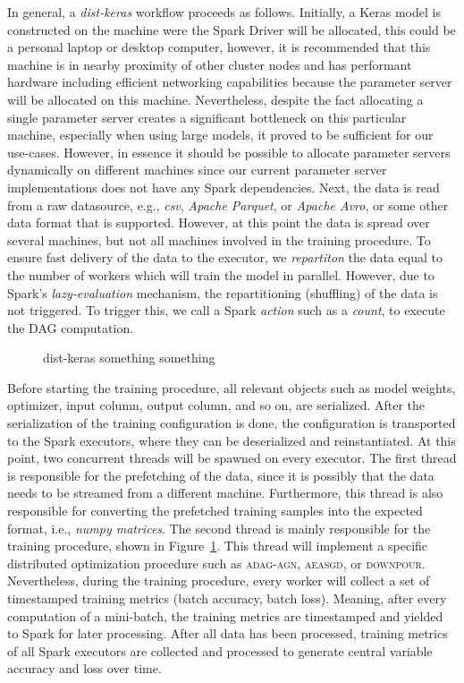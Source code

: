 In general, a \emph{dist-keras} workflow proceeds as follows. Initially, a Keras model is constructed on the machine were the Spark Driver will be allocated, this could be a personal laptop or desktop computer, however, it is recommended that this machine is in nearby proximity of other cluster nodes and has performant hardware including efficient networking capabilities because the parameter server will be allocated on this machine. Nevertheless, despite the fact allocating a single parameter server creates a significant bottleneck on this particular machine, especially when using large models, it proved to be sufficient for our use-cases. However, in essence it should be possible to allocate parameter servers dynamically on different machines since our current parameter server implementations does not have any Spark dependencies. Next, the data is read from a raw datasource, e.g., \emph{csv}, \emph{Apache Parquet}, or \emph{Apache Avro}, or some other data format that is supported. However, at this point the data is spread over several machines, but not all machines involved in the training procedure. To ensure fast delivery of the data to the executor, we \emph{repartiton} the data equal to the number of workers which will train the model in parallel. However, due to Spark's \emph{lazy-evaluation} mechanism, the repartitioning (shuffling) of the data is not triggered. To trigger this, we call a Spark \emph{action} such as a \emph{count}, to execute the DAG computation.

\begin{figure}[H]
  \centering
  \caption{dist-keras something something}
  \label{fig:dist_keras_architecture}
\end{figure}

Before starting the training procedure, all relevant objects such as model weights, optimizer, input column, output column, and so on, are serialized. After the serialization of the training configuration is done, the configuration is transported to the Spark executors, where they can be deserialized and reinstantiated. At this point, two concurrent threads will be spawned on every executor. The first thread is responsible for the prefetching of the data, since it is possibly that the data needs to be streamed from a different machine. Furthermore, this thread is also responsible for converting the prefetched training samples into the expected format, i.e., \emph{numpy matrices}. The second thread is mainly responsible for the training procedure, shown in Figure~\ref{fig:dist_keras_architecture}. This thread will implement a specific distributed optimization procedure such as \textsc{adag-agn}, \textsc{aeasgd}, or \textsc{downpour}. Nevertheless, during the training procedure, every worker will collect a set of timestamped training metrics (batch accuracy, batch loss). Meaning, after every computation of a mini-batch, the training metrics are timestamped and yielded to Spark for later processing. After all data has been processed, training metrics of all Spark executors are collected and processed to generate central variable accuracy and loss over time.\\

